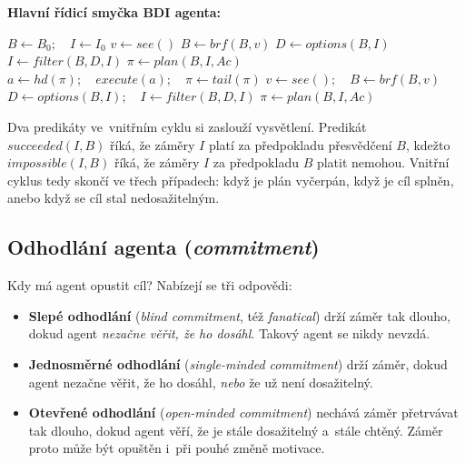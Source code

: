 \documentclass[11pt,a4paper]{article}
\theoremstyle{definition}
\begin{document}
\noindent\textbf{Hlavní řídicí smyčka BDI agenta:}
\begin{algorithmic}[1]
\State $B \gets B_0;\quad I \gets I_0$
  \State $v \gets \mathit{see}()$
  \State $B \gets \mathit{brf}(B,v)$
  \State $D \gets \mathit{options}(B,I)$
  \State $I \gets \mathit{filter}(B,D,I)$
  \State $\pi \gets \mathit{plan}(B,I,\mathit{Ac})$
    \State $a \gets \mathit{hd}(\pi);\quad \mathit{execute}(a);\quad \pi \gets \mathit{tail}(\pi)$
    \State $v \gets \mathit{see}();\quad B \gets \mathit{brf}(B,v)$
      \State $D \gets \mathit{options}(B,I);\quad I \gets \mathit{filter}(B,D,I)$
    \EndIf
      \State $\pi \gets \mathit{plan}(B,I,\mathit{Ac})$ 
    \EndIf
  \EndWhile
\EndWhile
\end{algorithmic}

Dva predikáty ve~vnitřním cyklu si zaslouží vysvětlení. Predikát $\mathit{succeeded}(I,B)$ říká,
že záměry $I$ platí za předpokladu přesvědčení $B$, kdežto $\mathit{impossible}(I,B)$ říká, že
záměry $I$ za předpokladu $B$ platit nemohou. Vnitřní cyklus tedy skončí ve třech případech:
když je plán vyčerpán, když je cíl splněn, anebo když se cíl stal nedosažitelným.

\subsection{Odhodlání agenta (\emph{commitment})}
\label{ssec:commitment}

\begin{defbox}
Kdy má agent opustit cíl? Nabízejí se tři odpovědi:
\begin{itemize}
\item \textbf{Slepé odhodlání} (\emph{blind commitment}, též \emph{fanatical}) drží záměr tak
  dlouho, dokud agent \emph{nezačne věřit, že ho dosáhl}. Takový agent se nikdy nevzdá.
\item \textbf{Jednosměrné odhodlání} (\emph{single-minded commitment}) drží záměr, dokud agent
  nezačne věřit, že ho dosáhl, \emph{nebo} že už není dosažitelný.
\item \textbf{Otevřené odhodlání} (\emph{open-minded commitment}) nechává záměr přetrvávat tak
  dlouho, dokud agent věří, že je stále dosažitelný a~stále chtěný. Záměr proto může být opuštěn
  i~při pouhé změně motivace.
\end{itemize}
\end{defbox}
\end{document}
